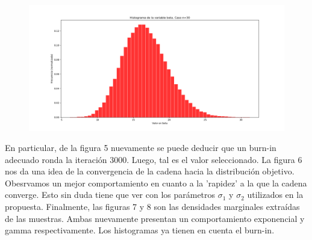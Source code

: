 \documentclass[letterpaper]{article}
\newcommand{\1}{\mathds{1}}
\theoremstyle{definition}
\theoremstyle{definition}
\theoremstyle{definition}
\theoremstyle{definition}
\theoremstyle{definition}
\begin{document}
\begin{figure}[h!]
    \centering
    \includegraphics[width=\linewidth]{8.png}
    \caption{}
\end{figure} 
En particular, de la figura 5 nuevamente se puede deducir que un burn-in adecuado ronda la iteración 3000. Luego, tal es 
el valor seleccionado. La figura 6 nos da una idea de la convergencia de la cadena hacia la distribución objetivo. Obesrvamos 
un mejor comportamiento en cuanto a la 'rapidez' a la que la cadena converge. Esto sin duda tiene que ver 
con los parámetros $\sigma_1$ y $\sigma_2$ utilizados en la propuesta. Finalmente, las figuras 7 y 8 son las 
densidades marginales extraídas de las muestras. Ambas nuevamente presentan un comportamiento exponencial y gamma 
respectivamente. Los histogramas ya tienen en cuenta el burn-in.
\newline
\end{document}
